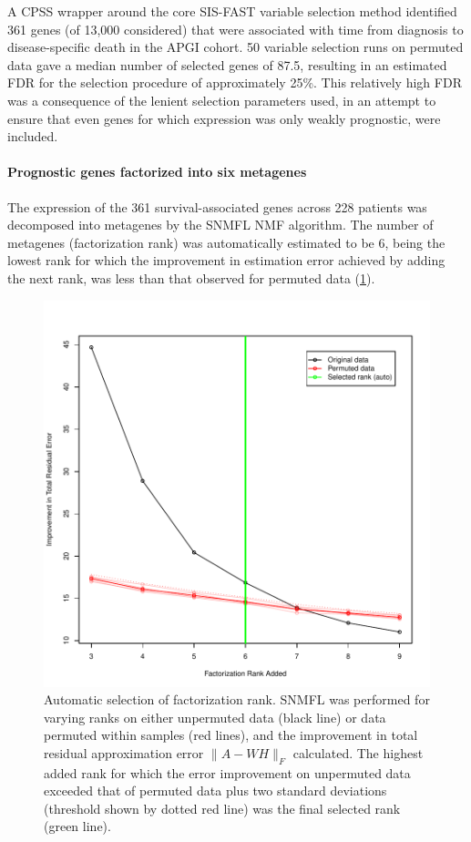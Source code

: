 \documentclass[dissertation.tex]{subfiles}
\begin{document}
A \gls{CPSS} wrapper around the core \gls{SIS}-\gls{FAST} variable selection method \cite{Gorst-Rasmussen2013} identified 361 genes (of 13,000 considered) that were associated with time from diagnosis to disease-specific death in the \gls{APGI} cohort.  50 variable selection runs on permuted data gave a median number of selected genes of 87.5, resulting in an estimated \gls{FDR} for the selection procedure of approximately 25\%.  This relatively high \gls{FDR} was a consequence of the lenient selection parameters used, in an attempt to ensure that even genes for which expression was only weakly prognostic, were included.

\paragraph{Prognostic genes factorized into six metagenes}
The expression of the 361 survival-associated genes across 228 patients was decomposed into metagenes by the \gls{SNMFL} \gls{NMF} algorithm.  The number of metagenes (factorization rank) was automatically estimated to be 6, being the lowest rank for which the improvement in estimation error achieved by adding the next rank, was less than that observed for permuted data (\cref{fig:sigs-nmf-rank}).

\begin{figure}
\centering
\includegraphics[width=.7\linewidth]{analysis/biosurv/reports/18_SIS_diag_dsd_final/figure/nmf-rank-plots-2}
\caption{Automatic selection of factorization rank.  \acrshort{SNMFL} was performed for varying ranks on either unpermuted data (black line) or data permuted within samples (red lines), and the improvement in total residual approximation error $\|A - W H\|_F$ calculated.  The highest added rank for which the error improvement on unpermuted data exceeded that of permuted data plus two standard deviations (threshold shown by dotted red line) was the final selected rank (green line).\label{fig:sigs-nmf-rank}}
\end{figure}
\end{document}
